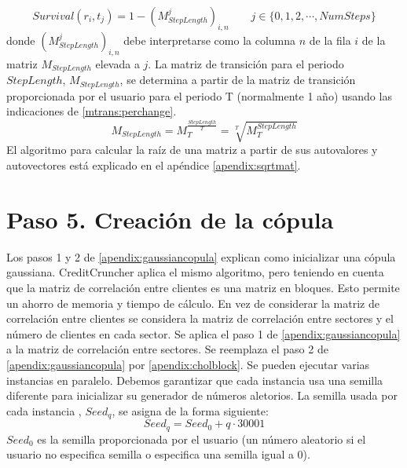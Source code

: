 \begin{displaymath}
Survival(r_i,t_j) = 1 - \left(M_{StepLength}^j\right)_{i,n} \qquad j \in \{0,1,2,\cdots,NumSteps\}
\end{displaymath}
donde $\left(M_{StepLength}^j\right)_{i,n}$ debe interpretarse como la columna $n$ de
la fila $i$ de la matriz $M_{StepLength}$ elevada a $j$. La matriz de transici\'on
para el periodo $StepLength$, $M_{StepLength}$, se determina a partir de la matriz
de transici\'on proporcionada por el usuario para el periodo T (normalmente 1 a\~no)
usando las indicaciones de \ref{mtrans:perchange}.
\begin{displaymath}
M_{StepLength} = M_{T}^{\frac{StepLength}{T}} = \sqrt[T]{M_{T}^{StepLength}}
\end{displaymath}
El algoritmo para calcular la ra\'iz de una matriz a partir de sus
autovalores y autovectores est\'a explicado en el ap\'endice
\ref{apendix:sqrtmat}.


\section{Paso 5. Creaci\'on de la c\'opula}

Los pasos 1 y 2 de \ref{apendix:gaussiancopula} explican como
inicializar una c\'opula gaussiana. CreditCruncher aplica el 
mismo algoritmo, pero teniendo en cuenta que la matriz de
correlaci\'on entre clientes es una matriz en bloques. Esto
permite un ahorro de memoria y tiempo de c\'alculo. En vez de
considerar la matriz de correlaci\'on entre clientes se
considera la matriz de correlaci\'on entre sectores y el
n\'umero de clientes en cada sector. Se aplica el paso 1
de \ref{apendix:gaussiancopula} a la matriz de correlaci\'on
entre sectores. Se reemplaza el paso 2 de \ref{apendix:gaussiancopula}
por \ref{apendix:cholblock}.
\newline
\newline
Se pueden ejecutar varias instancias en paralelo. Debemos garantizar
que cada instancia usa una semilla diferente para inicializar su 
generador de n\'umeros aletorios. La semilla usada por cada instancia
, $Seed_q$, se asigna de la forma siguiente:
\begin{displaymath}
Seed_q = Seed_0 + q \cdot 30001
\end{displaymath}
$Seed_0$ es la semilla proporcionada por el usuario (un n\'umero aleatorio 
si el usuario no especifica semilla o especifica una semilla igual a 0).

